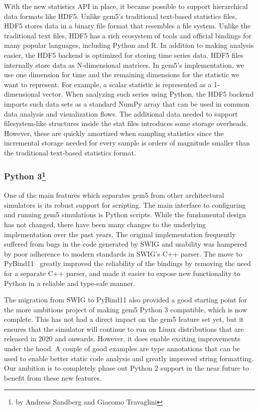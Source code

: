 With the new statistics API in place, it became possible to support hierarchical data formats like HDF5.
Unlike gem5's traditional text-based statistics files, HDF5 stores data in a binary file format that resembles a file system.
Unlike the traditional text files, HDF5 has a rich ecosystem of tools and official bindings for many popular languages, including Python and R.
In addition to making analysis easier, the HDF5 backend is optimized for storing time series data.
HDF5 files internally store data as N-dimensional matrices.
In gem5's implementation, we use one dimension for time and the remaining dimensions for the statistic we want to represent.
For example, a scalar statistic is represented as a 1-dimensional vector.
When analyzing such series using Python, the HDF5 backend imports such data sets as a standard NumPy array that can be used in common data analysis and visualization flows.
The additional data needed to support filesystem-like structures inside the stat files introduces some storage overheads.
However, these are quickly amortized when sampling statistics since the incremental storage needed for every sample is orders of magnitude smaller than the traditional text-based statistics format.

\subsubsection[Python 3]{Python 3\footnote{by Andreas Sandberg and Giacomo Travaglini}}

One of the main features which separates gem5 from other architectural simulators is its robust support for scripting.
The main interface to configuring and running gem5 simulations is Python scripts.
While the fundamental design has not changed, there have been many changes to the underlying implementation over the past years.
The original implementation frequently suffered from bugs in the code generated by SWIG and usability was hampered by poor adherence to modern standards in SWIG's C++ parser.
The move to PyBind11~\cite{pybind11} greatly improved the reliability of the bindings by removing the need for a separate C++ parser, and made it easier to expose new functionality to Python in a reliable and type-safe manner.

The migration from SWIG to PyBind11 also provided a good starting point for the more ambitious project of making gem5 Python 3 compatible, which is now complete.
This has not had a direct impact on the gem5 feature set yet, but it ensures that the simulator will continue to run on Linux distributions that are released in 2020 and onwards.
However, it does enable exciting improvements under the hood.
A couple of good examples are type annotations that can be used to enable better static code analysis and greatly improved string formatting.
Our ambition is to completely phase out Python 2 support in the near future to benefit from these new features.

